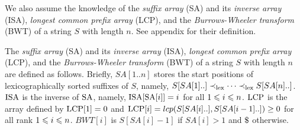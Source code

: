We also assume the knowledge of the \textit{suffix array} (SA) and its \textit{inverse array} (ISA), \textit{longest common prefix array} (LCP), and the \textit{Burrows-Wheeler transform} (BWT) of a string $S$ with length $n$. See appendix for their definition. 

\begin{toappendix}
The \textit{suffix array} (SA) and its \textit{inverse array} (ISA), \textit{longest common prefix array} (LCP), and the \textit{Burrows-Wheeler transform} (BWT) of a string $S$ with length $n$ are defined as follows. 
Briefly, $SA[1..n]$ stores the start positions of lexicographically sorted suffixes of $S$, namely, 
$S[SA[1]..] \prec_\lex \dots \prec_\lex S[SA[n]..]$. 
$\ISA$ is the inverse of $\SA$, namely, $\ISA[\SA[i]] = i$ for all $\btw i1n$.
$\LCP$ is the array defined by $\LCP[1] = 0$ and $\LCP[i] = lcp(S[SA[i]..], S[SA[i-1]..]) \ge 0$ for all rank $\btw i1n$. 
$BWT[i]$ is $S[SA[i]-1]$ if $SA[i]>1$ and $\daller$ otherwise.
\end{toappendix}






